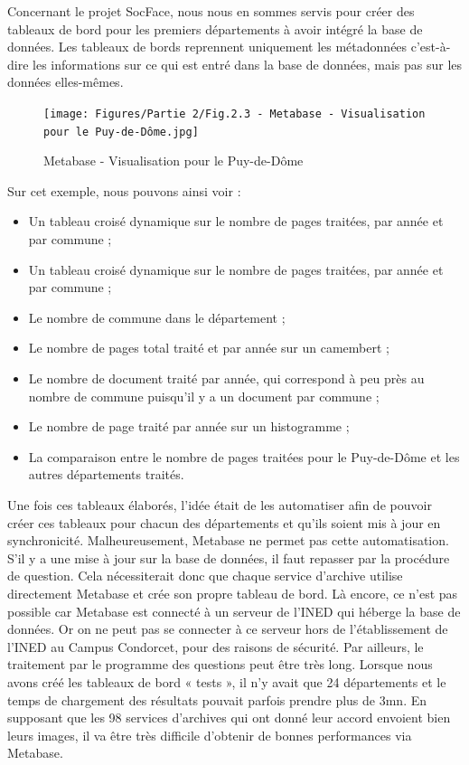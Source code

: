 Concernant le projet SocFace, nous nous en sommes servis pour créer des tableaux de bord pour les premiers départements à avoir intégré la base de données. Les tableaux de bords reprennent uniquement les métadonnées c’est-à-dire les informations sur ce qui est entré dans la base de données, mais pas sur les données elles-mêmes. 
\clearpage

\begin{figure}[H]
        \centering
        \texttt{[image: Figures/Partie 2/Fig.2.3 - Metabase - Visualisation pour le Puy-de-Dôme.jpg]}
        \caption[ Metabase - Visualisation pour le Puy-de-Dôme]{ Metabase - Visualisation pour le Puy-de-Dôme}
        \label{fig:Fig2.3}
    \end{figure}

Sur cet exemple, nous pouvons ainsi voir : 
\begin{itemize}
    \item Un tableau croisé dynamique sur le nombre de pages traitées, par année et par commune ;
    \item Un tableau croisé dynamique sur le nombre de pages traitées, par année et par commune ;
    \item Le nombre de commune dans le département ;
    \item Le nombre de pages total traité et par année sur un camembert ; 
    \item Le nombre de document traité par année, qui correspond à peu près au nombre de commune puisqu’il y a un document par commune ; 
    \item Le nombre de page traité par année sur un histogramme ;
    \item La comparaison entre le nombre de pages traitées pour le Puy-de-Dôme et les autres départements traités. 
\end{itemize}

Une fois ces tableaux élaborés, l’idée était de les automatiser afin de pouvoir créer ces tableaux pour chacun des départements et qu’ils soient mis à jour en synchronicité. Malheureusement, Metabase ne permet pas cette automatisation. S’il y a une mise à jour sur la base de données, il faut repasser par la procédure de question. Cela nécessiterait donc que chaque service d’archive utilise directement Metabase et crée son propre tableau de bord. Là encore, ce n’est pas possible car Metabase est connecté à un serveur de l’INED qui héberge la base de données. Or on ne peut pas se connecter à ce serveur hors de l’établissement de l’INED au Campus Condorcet, pour des raisons de sécurité. Par ailleurs, le traitement par le programme des questions peut être très long. Lorsque nous avons créé les tableaux de bord « tests », il n’y avait que 24 départements et le temps de chargement des résultats pouvait parfois prendre plus de 3mn. En supposant que les 98 services d’archives qui ont donné leur accord envoient bien leurs images, il va être très difficile d’obtenir de bonnes performances via Metabase. \\


